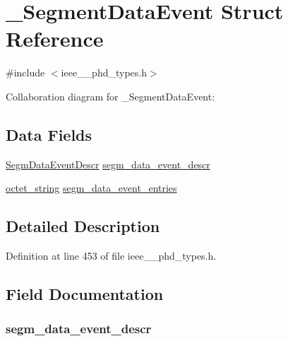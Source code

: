 \hypertarget{struct___segment_data_event}{}\section{\+\_\+\+Segment\+Data\+Event Struct Reference}
\label{struct___segment_data_event}


{\ttfamily \#include $<$ieee\+\_\+\_\+phd\+\_\+types.\+h$>$}



Collaboration diagram for \+\_\+\+Segment\+Data\+Event\+:
\subsection*{Data Fields}
\begin{DoxyCompactItemize}
\item 
\hyperlink{ieee__11073__phd__types_8h_a27fbf18ec4622cdc3077368771b1ba92}{Segm\+Data\+Event\+Descr} \hyperlink{struct___segment_data_event_a68f1efd53586d9809bc2d61844b88568}{segm\+\_\+data\+\_\+event\+\_\+descr}
\item 
\hyperlink{ieee__11073__phd__types_8h_a5524261dd425fc0bd90c9d87277b7127}{octet\+\_\+string} \hyperlink{struct___segment_data_event_a6c8af5e311383b41ff92f9586c86a971}{segm\+\_\+data\+\_\+event\+\_\+entries}
\end{DoxyCompactItemize}


\subsection{Detailed Description}


Definition at line 453 of file ieee\+\_\+\_\+phd\+\_\+types.\+h.



\subsection{Field Documentation}
\hypertarget{struct___segment_data_event_a68f1efd53586d9809bc2d61844b88568}{}
\subsubsection[{segm\+\_\+data\+\_\+event\+\_\+descr}]{ segm\+\_\+data\+\_\+event\+\_\+descr}\label{struct___segment_data_event_a68f1efd53586d9809bc2d61844b88568}


